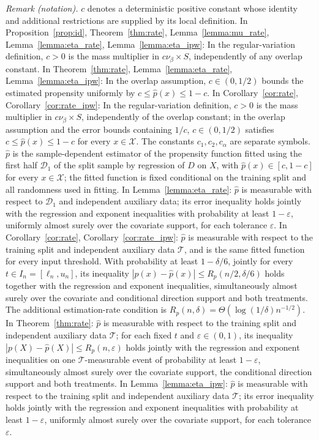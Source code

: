\documentclass[12pt]{article}
\theoremstyle{plain}
\theoremstyle{definition}
\begin{document}
\noindent\textit{Remark (notation).} $c$ denotes a deterministic positive constant whose identity and additional restrictions are supplied by its local definition. In Proposition~\ref{prop:id}, Theorem~\ref{thm:rate}, Lemma~\ref{lemma:mu_rate}, Lemma~\ref{lemma:eta_rate}, Lemma~\ref{lemma:eta_ipw}: In the regular-variation definition, $c>0$ is the mass multiplier in $c\nu_\beta\times S$, independently of any overlap constant. In Theorem~\ref{thm:rate}, Lemma~\ref{lemma:eta_rate}, Lemma~\ref{lemma:eta_ipw}: In the overlap assumption, $c\in(0,1/2)$ bounds the estimated propensity uniformly by $c\leq\hat p(x)\leq1-c$. In Corollary~\ref{cor:rate}, Corollary~\ref{cor:rate_ipw}: In the regular-variation definition, $c>0$ is the mass multiplier in $c\nu_\beta\times S$, independently of the overlap constant; in the overlap assumption and the error bounds containing $1/c$, $c\in(0,1/2)$ satisfies $c\leq\hat p(x)\leq1-c$ for every $x\in\mathcal X$. The constants $c_1,c_2,c_\alpha$ are separate symbols. $\hat p$ is the sample-dependent estimator of the propensity function fitted using the first half $\mathcal D_1$ of the split sample by regression of $D$ on $X$, with $\hat p(x)\in[c,1-c]$ for every $x\in\mathcal X$; the fitted function is fixed conditional on the training split and all randomness used in fitting. In Lemma~\ref{lemma:eta_rate}: $\hat p$ is measurable with respect to $\mathcal D_1$ and independent auxiliary data; its error inequality holds jointly with the regression and exponent inequalities with probability at least $1-\varepsilon$, uniformly almost surely over the covariate support, for each tolerance $\varepsilon$. In Corollary~\ref{cor:rate}, Corollary~\ref{cor:rate_ipw}: $\hat p$ is measurable with respect to the training split and independent auxiliary data $\mathcal T$, and is the same fitted function for every input threshold. With probability at least $1-\delta/6$, jointly for every $t\in I_n=[\ell_n,u_n]$, its inequality $|p(x)-\hat p(x)|\leq R_p(n/2,\delta/6)$ holds together with the regression and exponent inequalities, simultaneously almost surely over the covariate and conditional direction support and both treatments. The additional estimation-rate condition is $R_p(n,\delta)=\Theta(\log(1/\delta)n^{-1/2})$. In Theorem~\ref{thm:rate}: $\hat p$ is measurable with respect to the training split and independent auxiliary data $\mathcal T$; for each fixed $t$ and $\varepsilon\in(0,1)$, its inequality $|p(X)-\hat p(X)|\leq R_p(n,\varepsilon)$ holds jointly with the regression and exponent inequalities on one $\mathcal T$-measurable event of probability at least $1-\varepsilon$, simultaneously almost surely over the covariate support, the conditional direction support and both treatments. In Lemma~\ref{lemma:eta_ipw}: $\hat p$ is measurable with respect to the training split and independent auxiliary data $\mathcal T$; its error inequality holds jointly with the regression and exponent inequalities with probability at least $1-\varepsilon$, uniformly almost surely over the covariate support, for each tolerance $\varepsilon$.
\end{document}
